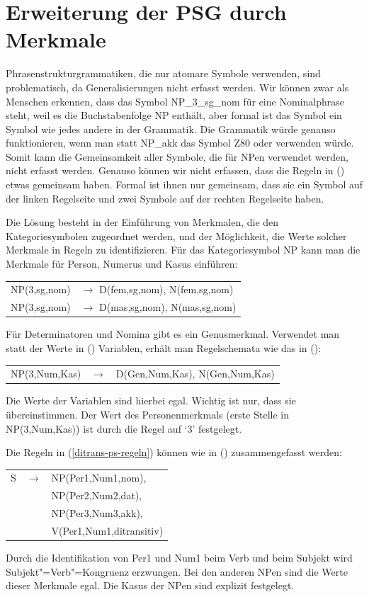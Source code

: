 \section{Erweiterung der PSG durch Merkmale}


Phrasenstrukturgrammatiken, die nur atomare Symbole verwenden, sind problematisch,
da Generalisierungen nicht erfasst werden. Wir können zwar als Menschen erkennen, dass
das Symbol NP\_3\_sg\_nom für eine Nominalphrase steht, weil es die Buchstabenfolge NP
enthält, aber formal ist das Symbol ein Symbol wie jedes andere in der Grammatik. Die Grammatik
würde genauso funktionieren, wenn man statt NP\_akk das Symbol Z80 oder \smiley{} verwenden würde. Somit kann die
Gemeinsamkeit aller Symbole, die für NPen verwendet werden, nicht erfasst werden. 
Genauso können wir nicht erfassen, dass die Regeln in () etwas gemeinsam haben.
Formal ist ihnen nur gemeinsam, dass sie ein Symbol auf der linken Regelseite und 
zwei Symbole auf der rechten Regelseite haben.

Die Lösung besteht in der Einführung von Merkmalen, die den Kategoriesymbolen
zugeordnet werden, und der Möglichkeit, die Werte solcher Merkmale in Regeln zu identifizieren.
Für das Kategoriesymbol NP kann man \zb die Merkmale für Person, Numerus und Kasus einführen:
\ea
\begin{tabular}[t]{@{}l@{ }l}
NP(3,sg,nom)  & $\to$ D(fem,sg,nom), N(fem,sg,nom)\\
NP(3,sg,nom)  & $\to$ D(mas,sg,nom), N(mas,sg,nom)\\
\end{tabular}
\z
Für Determinatoren und Nomina gibt es ein Genusmerkmal. Verwendet man statt der
Werte in () Variablen, erhält man Regelschemata wie das in ():
\ea
\begin{tabular}[t]{@{}l@{ }l@{ }l}
NP({3},{Num},{Kas}) & $\to$ & D(Gen,{Num},{Kas}), N(Gen,{Num},{Kas})\\
\end{tabular}
\z
Die Werte der Variablen sind hierbei egal. Wichtig ist nur, dass sie übereinstimmen.
Der Wert des Personenmerkmals (erste Stelle in NP(3,Num,Kas)) ist durch die Regel auf `3' festgelegt.

Die Regeln in (\ref{ditrans-ps-regeln}) können wie in () zusammengefasst werden:
\ea
\begin{tabular}[t]{@{}l@{ }l@{ }l}
S  & $\to$ & NP({Per1},{Num1},{nom}), \\
   &       & NP(Per2,Num2,{dat}),\\
   &       & NP(Per3,Num3,{akk}),\\
   &       & V({Per1},{Num1},ditransitiv)\\
\end{tabular}
\z
Durch die Identifikation von Per1 und Num1 beim Verb und beim Subjekt wird Subjekt"=Verb"=Kongruenz erzwungen.
Bei den anderen NPen sind die Werte dieser Merkmale egal. Die Kasus der NPen sind explizit festgelegt.

